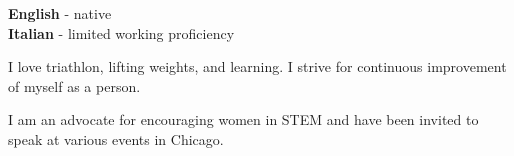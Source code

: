 \documentclass[9pt]{developercv} %
\begin{document}
\begin{minipage}[t]{0.3\textwidth}
	\vspace{-\baselineskip} %

	
	\textbf{English} - native\\
	\textbf{Italian} - limited working proficiency
\end{minipage}
\hfill
\begin{minipage}[t]{0.3\textwidth}
	\vspace{-\baselineskip} %
	
	
	I love triathlon, lifting weights, and learning. I strive for continuous improvement of myself as a person.
	\end{minipage}
\hfill
\begin{minipage}[t]{0.3\textwidth}
	\vspace{-\baselineskip} %
	
	
	I am an advocate for encouraging women in STEM and have been invited to speak at various events in Chicago.
\end{minipage}

\end{document}
